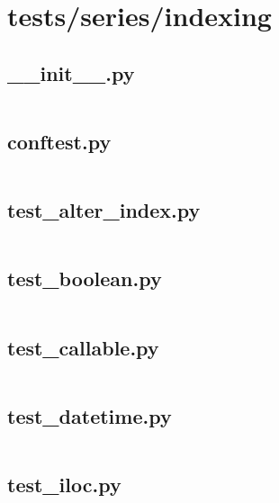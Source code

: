 \documentclass{article}
\begin{document}
\section{tests/series/indexing}

\subsection{\_\_init\_\_.py}
\inputminted{python}{/home/dufferzafar/dev/@clones/pandas/pandas/tests/series/indexing/__init__.py}
\newpage

\subsection{conftest.py}
\inputminted{python}{/home/dufferzafar/dev/@clones/pandas/pandas/tests/series/indexing/conftest.py}
\newpage

\subsection{test\_alter\_index.py}
\inputminted{python}{/home/dufferzafar/dev/@clones/pandas/pandas/tests/series/indexing/test_alter_index.py}
\newpage

\subsection{test\_boolean.py}
\inputminted{python}{/home/dufferzafar/dev/@clones/pandas/pandas/tests/series/indexing/test_boolean.py}
\newpage

\subsection{test\_callable.py}
\inputminted{python}{/home/dufferzafar/dev/@clones/pandas/pandas/tests/series/indexing/test_callable.py}
\newpage

\subsection{test\_datetime.py}
\inputminted{python}{/home/dufferzafar/dev/@clones/pandas/pandas/tests/series/indexing/test_datetime.py}
\newpage

\subsection{test\_iloc.py}
\inputminted{python}{/home/dufferzafar/dev/@clones/pandas/pandas/tests/series/indexing/test_iloc.py}
\newpage
\end{document}
